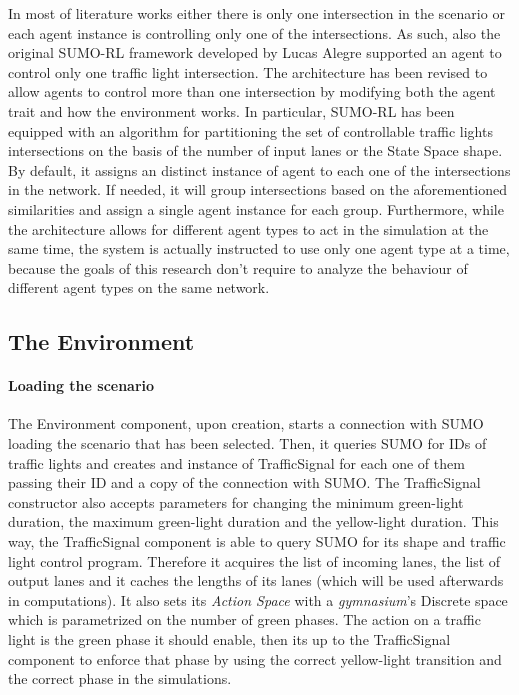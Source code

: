 In most of literature works either there is only one intersection in the scenario or each agent instance is controlling only one of the intersections. As such, also the original SUMO-RL framework \cite{sumorl} developed by Lucas Alegre supported an agent to control only one traffic light intersection.
The architecture has been revised to allow agents to control more than one intersection by modifying both the agent trait and how the environment works.
In particular, SUMO-RL has been equipped with an algorithm for partitioning the set of controllable traffic lights intersections on the basis of the number of input lanes or the State Space shape.
By default, it assigns an distinct instance of agent to each one of the intersections in the network. If needed, it will group intersections based on the aforementioned similarities and assign a single agent instance for each group.
Furthermore, while the architecture allows for different agent types to act in the simulation at the same time, the system is actually instructed to use only one agent type at a time, because the goals of this research don't require to analyze the behaviour of different agent types on the same network.


\subsection{The Environment}


\paragraph{Loading the scenario}

The Environment component, upon creation, starts a connection with SUMO loading the scenario that has been selected. Then, it queries SUMO for IDs of traffic lights and creates and instance of TrafficSignal for each one of them passing their ID and a copy of the connection with SUMO.
The TrafficSignal constructor also accepts parameters for changing the minimum green-light duration, the maximum green-light duration and the yellow-light duration.
This way, the TrafficSignal component is able to query SUMO for its shape and traffic light control program.
Therefore it acquires the list of incoming lanes, the list of output lanes and it caches the lengths of its lanes (which will be used afterwards in computations).
It also sets its \textit{Action Space} with a \textit{gymnasium}'s Discrete space which is parametrized on the number of green phases.
The action on a traffic light is the green phase it should enable, then its up to the TrafficSignal component to enforce that phase by using the correct yellow-light transition and the correct phase in the simulations.


